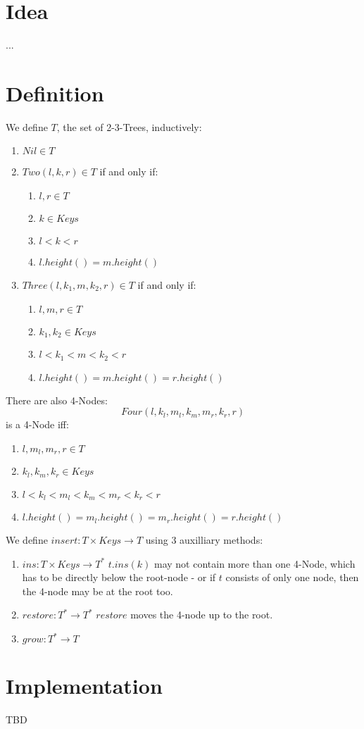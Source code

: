 \documentclass{article}
\begin{document}
\section*{Idea}
...

\section*{Definition}
We define \(T\), the set of 2-3-Trees, inductively:

\begin{enumerate}
	\item \(Nil \in T\)
 \item \(Two(l, k, r) \in T\) if and only if:
	\begin{enumerate}
		\item \(l, r \in T\)
  		\item \(k \in Keys\)
    \item \(l < k < r\)
    \item \(l.height() = m.height()\)
	\end{enumerate}
 \item \(Three(l, k_1, m, k_2, r) \in T\) if and only if:
	\begin{enumerate}
		\item \(l, m, r \in T\)
		\item \(k_1, k_2 \in Keys\)
  \item \(l < k_1 < m < k_2 < r\)
  \item \(l.height() = m.height() = r.height()\)
	\end{enumerate}
\end{enumerate}

There are also 4-Nodes:
\[Four(l, k_l, m_l, k_m, m_r, k_r, r)\]
is a 4-Node iff:
\begin{enumerate}
	\item \(l, m_l, m_r, r \in T\)
 \item \(k_l, k_m, k_r \in Keys\)
 \item \(l < k_l < m_l < k_m < m_r < k_r < r\)
 \item \(l.height() = m_l.height() = m_r.height() = r.height()\)
\end{enumerate}


We define \(insert: T \times Keys \rightarrow T\) using 3 auxilliary methods:
\begin{enumerate}
	\item \(ins: T \times Keys \rightarrow T^*\)
		\(t.ins(k)\) may not contain more than one 4-Node, which has to be directly below the root-node - or if \(t\) consists of only one node, then the 4-node may be at the root too.
 \item \(restore: T^* \rightarrow T^*\)
		\(restore\) moves the 4-node up to the root.
 \item \(grow: T^* \rightarrow T\)
\end{enumerate}

\section*{Implementation}
TBD
\end{document}
